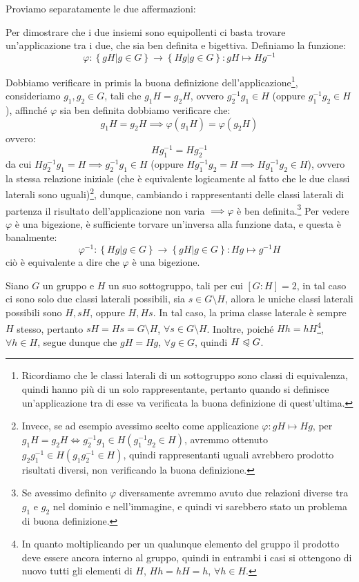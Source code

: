 \documentclass[11pt]{scrartcl}
\begin{document}
\begin{soln}
Proviamo separatamente le due affermazioni:
\begin{enumerate}[(1)]
	\ii Per dimostrare che i due insiemi sono equipollenti ci basta trovare un'applicazione tra i due, che sia ben definita e bigettiva. Definiamo la funzione:
		\[ \varphi : \left\{gH | g \in G\right\} \longrightarrow \left\{Hg | g \in G\right\} : gH \longmapsto Hg^{-1}
		\]
	\begin{enumerate}[(a)]
		\ii Dobbiamo verificare in primis la buona definizione dell'applicazione\footnote{Ricordiamo che le classi laterali di un sottogruppo sono classi di equivalenza, quindi hanno più di un solo rappresentante, pertanto quando si definisce un'applicazione tra di esse va verificata la buona definizione di quest'ultima.}, consideriamo $g_1,g_2 \in G$, tali che $g_1H=g_2H$, ovvero $g_2^{-1}g_1 \in H$ (oppure $g_1^{-1}g_2 \in H$), affinché $\varphi$ sia ben definita dobbiamo verificare che:
		\[ g_1H=g_2H
		\implies
		\varphi(g_1H)=\varphi(g_2H)
		\]
ovvero:
		\[ Hg_1^{-1}=Hg_2^{-1}
		\]
		da cui $Hg_2^{-1}g_1=H \implies g_2^{-1}g_1 \in H$ (oppure $Hg_1^{-1}g_2=H \implies Hg_1^{-1}g_2 \in H$), ovvero la stessa relazione iniziale (che è equivalente logicamente al fatto che le due classi laterali sono uguali)\footnote{Invece, se ad esempio avessimo scelto come applicazione $\varphi: gH \longmapsto Hg$, per $g_1H=g_2H \iff g_2^{-1}g_1 \in H (g_1^{-1}g_2 \in H)$, avremmo ottenuto $g_2g_1^{-1} \in H(g_1g_2^{-1} \in H)$, quindi rappresentanti uguali avrebbero prodotto risultati diversi, non verificando la buona definizione.}, dunque, cambiando i rappresentanti delle classi laterali di partenza il risultato dell'applicazione non varia $\implies \varphi$ è ben definita.\footnote{Se avessimo definito $\varphi$ diversamente avremmo avuto due relazioni diverse tra $g_1$ e $g_2$ nel dominio e nell'immagine, e quindi vi sarebbero stato un problema di buona definizione.}
		\ii Per vedere $\varphi$ è una bigezione, è sufficiente torvare un'inversa alla funzione data, e questa è banalmente:
			\[ \varphi^{-1} : \left\{Hg | g \in G\right\} \longrightarrow \left\{gH | g \in G\right\} : Hg \longmapsto g^{-1}H\]
			ciò è equivalente a dire che $\varphi$ è una bigezione.
		\end{enumerate}
	\ii Siano $G$ un gruppo e $H$ un suo sottogruppo, tali per cui $[G : H] = 2$, in tal caso ci sono solo due classi laterali possibili, sia $s \in G\setminus H$, allora le uniche classi laterali possibili sono $H, sH$, oppure $H, Hs$. In tal caso, la prima classe laterale è sempre $H$ stesso, pertanto $sH=Hs=G\setminus H$, $\forall s \in G\setminus H$. Inoltre, poiché $Hh=hH$\footnote{In quanto moltiplicando per un qualunque elemento del gruppo il prodotto deve essere ancora interno al gruppo, quindi in entrambi i casi si ottengono di nuovo tutti gli elementi di $H$, $Hh=hH=h$, $\forall h \in H$.}, $\forall h \in H$, segue dunque che $gH=Hg$, $\forall g \in G$, quindi $H \trianglelefteqslant G$.
	\end{enumerate}
\end{soln}
\end{document}
